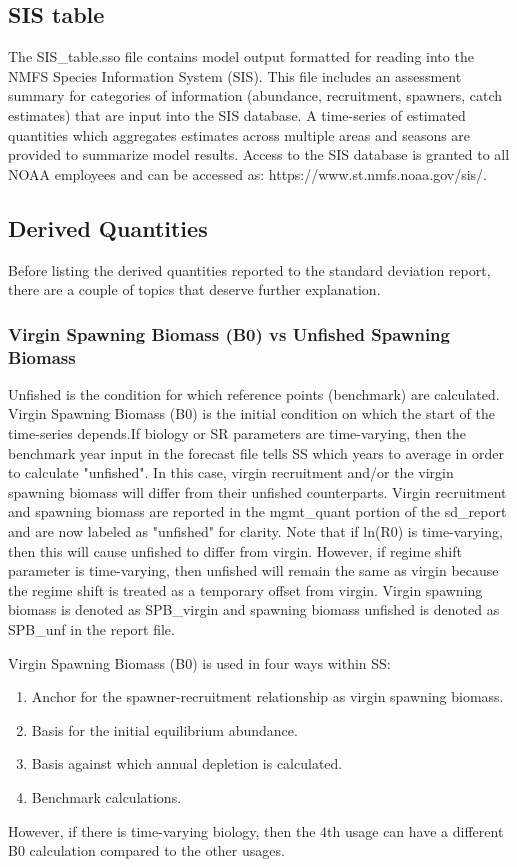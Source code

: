 \subsection{SIS table}
The SIS\_table.sso file contains model output formatted for reading into the NMFS Species Information System (SIS). This file includes an assessment summary for categories of information (abundance, recruitment, spawners, catch estimates) that are input into the SIS database. A time-series of estimated quantities which aggregates estimates across multiple areas and seasons are provided to summarize model results. Access to the SIS database is granted to all NOAA employees and can be accessed as: https://www.st.nmfs.noaa.gov/sis/.

\subsection{Derived Quantities}
Before listing the derived quantities reported to the standard deviation report, there are a couple of topics that deserve further explanation.

\hypertarget{VirginUnfished}{}
\subsubsection{Virgin Spawning Biomass (B0) vs Unfished Spawning Biomass}
Unfished is the condition for which reference points (benchmark) are calculated.  Virgin Spawning Biomass (B0) is the initial condition on which the start of the time-series depends.If biology or SR parameters are time-varying, then the benchmark year input in the forecast file tells SS which years to average in order to calculate "unfished". In this case, virgin recruitment and/or the virgin spawning biomass will differ from their unfished counterparts. Virgin recruitment and spawning biomass are reported in the mgmt\_quant portion of the sd\_report and are now labeled as "unfished" for clarity.  Note that if ln(R0) is time-varying, then this will cause unfished to differ from virgin. However, if regime shift parameter is time-varying, then unfished will remain the same as virgin because the regime shift is treated as a temporary offset from virgin. Virgin spawning biomass is denoted as SPB\_virgin and spawning biomass unfished is denoted as SPB\_unf in the report file.

Virgin Spawning Biomass (B0) is used in four ways within SS:
\begin{enumerate}
	\item Anchor for the spawner-recruitment relationship as virgin spawning biomass.
	\item Basis for the initial equilibrium abundance. 
	\item Basis against which annual depletion is calculated.
	\item Benchmark calculations.
\end{enumerate}
However, if there is time-varying biology, then the 4th usage can have a different B0 calculation compared to the other usages.

